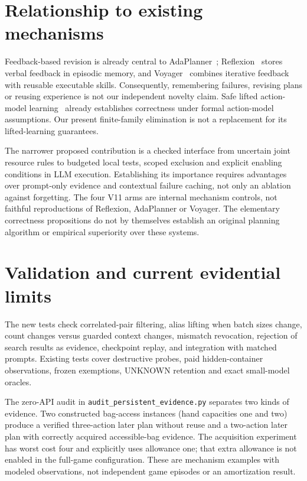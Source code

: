 \documentclass[11pt]{article}
\theoremstyle{definition}
\begin{document}
\section{Relationship to existing mechanisms}
Feedback-based revision is already central to AdaPlanner~\cite{adaplanner};
Reflexion~\cite{reflexion} stores verbal feedback in episodic memory, and
Voyager~\cite{voyager} combines iterative feedback with reusable executable
skills. Consequently, remembering failures, revising plans or reusing experience
is not our independent novelty claim. Safe lifted action-model
learning~\cite{juba2021} already establishes correctness under formal action-model
assumptions. Our present finite-family elimination is not a replacement for its
lifted-learning guarantees.

The narrower proposed contribution is a checked interface from uncertain joint
resource rules to budgeted local tests, scoped exclusion and explicit enabling
conditions in LLM execution. Establishing its importance requires advantages
over prompt-only evidence and contextual failure caching, not only an ablation
against forgetting. The four V11 arms are internal mechanism controls, not
faithful reproductions of Reflexion, AdaPlanner or Voyager. The elementary
correctness propositions do not by themselves establish an original planning
algorithm or empirical superiority over these systems.

\section{Validation and current evidential limits}
The new tests check correlated-pair filtering, alias lifting when batch sizes
change, count changes versus guarded context changes, mismatch revocation,
rejection of search results as evidence, checkpoint replay, and integration with
matched prompts. Existing tests cover destructive probes, paid hidden-container
observations, frozen exemptions, UNKNOWN retention and exact small-model oracles.

The zero-API audit in \texttt{audit\_persistent\_evidence.py} separates two kinds
of evidence. Two constructed bag-access instances (hand capacities one and two)
produce a verified three-action later plan without reuse and a two-action later
plan with correctly acquired accessible-bag evidence. The acquisition experiment
has worst cost four and explicitly uses allowance one; that extra allowance is
not enabled in the full-game configuration. These are mechanism examples with
modeled observations, not independent game episodes or an amortization result.
\end{document}

